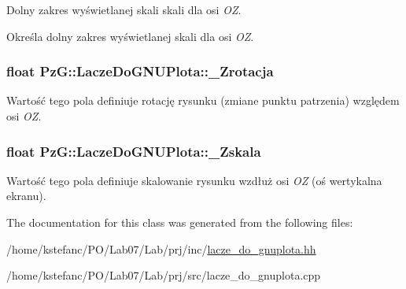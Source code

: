 Dolny zakres wyświetlanej skali skali dla osi {\itshape O\+Z}. 

Określa dolny zakres wyświetlanej skali dla osi {\itshape O\+Z}. \hypertarget{class_pz_g_1_1_lacze_do_g_n_u_plota_aa65781b1ff96dfb31a780e98ee28d6ed}{
\subsubsection[{\+\_\+\+Zrotacja}]{\setlength{\rightskip}{0pt plus 5cm}float Pz\+G\+::\+Lacze\+Do\+G\+N\+U\+Plota\+::\+\_\+\+Zrotacja\hspace{0.3cm}{\ttfamily [protected]}}}\label{class_pz_g_1_1_lacze_do_g_n_u_plota_aa65781b1ff96dfb31a780e98ee28d6ed}
Wartość tego pola definiuje rotację rysunku (zmiane punktu patrzenia) względem osi {\itshape O\+Z}. \hypertarget{class_pz_g_1_1_lacze_do_g_n_u_plota_a85446d06b2d714b2f852ef43c47c73c1}{
\subsubsection[{\+\_\+\+Zskala}]{\setlength{\rightskip}{0pt plus 5cm}float Pz\+G\+::\+Lacze\+Do\+G\+N\+U\+Plota\+::\+\_\+\+Zskala\hspace{0.3cm}{\ttfamily [protected]}}}\label{class_pz_g_1_1_lacze_do_g_n_u_plota_a85446d06b2d714b2f852ef43c47c73c1}
Wartość tego pola definiuje skalowanie rysunku wzdłuż osi {\itshape O\+Z} (oś wertykalna ekranu). 

The documentation for this class was generated from the following files\+:\begin{DoxyCompactItemize}
\item 
/home/kstefanc/\+P\+O/\+Lab07/\+Lab/prj/inc/\hyperlink{lacze__do__gnuplota_8hh}{lacze\+\_\+do\+\_\+gnuplota.\+hh}\item 
/home/kstefanc/\+P\+O/\+Lab07/\+Lab/prj/src/lacze\+\_\+do\+\_\+gnuplota.\+cpp\end{DoxyCompactItemize}
